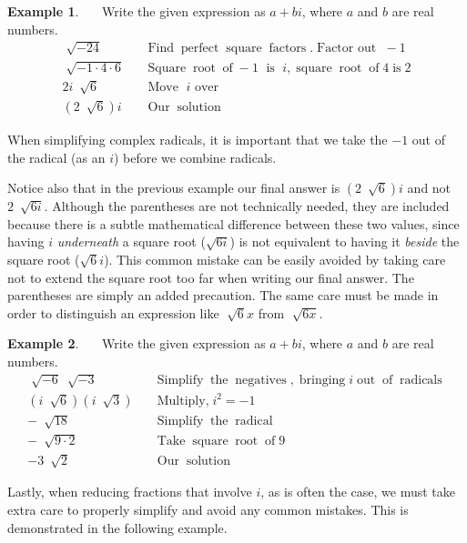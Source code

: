 \documentclass[12pt]{book}
\theoremstyle{definition}
\newtheorem{example}{Example}
\newcommand{\tmop}[1]{\ensuremath{\operatorname{#1}}}
\begin{document}
\begin{example}~~~Write the given expression as $a+bi$, where $a$ and $b$ are real numbers.
  \begin{eqnarray*}
    \sqrt[]{- 24} &  & \tmop{Find} \tmop{perfect} \tmop{square}
    \tmop{factors}. \tmop{Factor~out~} - 1\\
    \sqrt[]{- 1 \cdot 4 \cdot 6} &  & \tmop{Square} \tmop{root} \tmop{of} - 1
    \tmop{~is~} i, \tmop{square} \tmop{root} \tmop{of} 4 \tmop{is} 2\\
    2 i~\sqrt[]{6} &  & \tmop{Move~} i \text{~over}\\
    (2 ~\sqrt[]{6})i &  & \tmop{Our} \tmop{solution}
	\end{eqnarray*}
\end{example}
When simplifying complex radicals, it is important that we take the $- 1$ out of the radical (as an $i$) before we combine radicals.\par
Notice also that in the previous example our final answer is $(2 ~\sqrt[]{6})i$ and not $2 ~\sqrt[]{6i}$.  Although the parentheses are not technically needed, they are included because there is a subtle mathematical difference between these two values, since having $i$ \textit{underneath} a square root ($\sqrt{6i}$) is not equivalent to having it \textit{beside} the square root ($\sqrt{6}i$).  This common mistake can be easily avoided by taking care not to extend the square root too far when writing our final answer.  The parentheses are simply an added precaution.  The same care must be made in order to distinguish an expression like $\sqrt[]{6}x$ from $\sqrt[]{6x}$.
\begin{example}~~~Write the given expression as $a+bi$, where $a$ and $b$ are real numbers.
  \begin{eqnarray*}
    \sqrt[]{- 6} ~\sqrt[]{- 3} &  & \tmop{Simplify} \tmop{the}
    \tmop{negatives}, \tmop{bringing} i \tmop{out} \tmop{of} \tmop{radicals}\\
    (i ~\sqrt[]{6}) (i ~\sqrt[]{3}) &  & \tmop{Multiply,}
    i^2 = - 1\\
    - ~\sqrt[]{18} &  & \tmop{Simplify} \tmop{the} \tmop{radical}\\
    - ~\sqrt[]{9 \cdot 2} &  & \tmop{Take} \tmop{square} \tmop{root} \tmop{of}
    9\\
    - 3 ~\sqrt[]{2} &  & \tmop{Our} \tmop{solution}
  \end{eqnarray*}
\end{example}
Lastly, when reducing fractions that involve $i$, as is often the case, we must take extra care to properly simplify and avoid any common mistakes. This is demonstrated in the following example.
\end{document}
